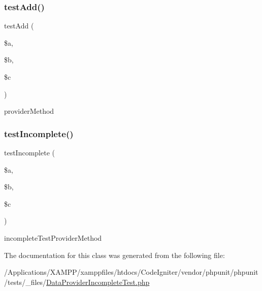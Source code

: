 \subsubsection{\texorpdfstring{test\+Add()}{testAdd()}}
{\footnotesize\ttfamily test\+Add (\begin{DoxyParamCaption}\item[{}]{\$a,  }\item[{}]{\$b,  }\item[{}]{\$c }\end{DoxyParamCaption})}

provider\+Method \mbox{\label{class_data_provider_incomplete_test_a0365f9f81018cb0b6dc69297023aae35}} 
\subsubsection{\texorpdfstring{test\+Incomplete()}{testIncomplete()}}
{\footnotesize\ttfamily test\+Incomplete (\begin{DoxyParamCaption}\item[{}]{\$a,  }\item[{}]{\$b,  }\item[{}]{\$c }\end{DoxyParamCaption})}

incomplete\+Test\+Provider\+Method 

The documentation for this class was generated from the following file\+:\begin{DoxyCompactItemize}
\item 
/\+Applications/\+X\+A\+M\+P\+P/xamppfiles/htdocs/\+Code\+Igniter/vendor/phpunit/phpunit/tests/\+\_\+files/\mbox{\hyperlink{_data_provider_incomplete_test_8php}{Data\+Provider\+Incomplete\+Test.\+php}}\end{DoxyCompactItemize}
